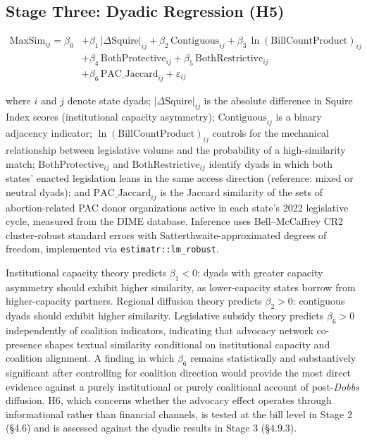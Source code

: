 \subsection{Stage Three: Dyadic Regression (H5)}
\label{sec:stage3}


\begin{equation}
\begin{aligned}
\text{MaxSim}_{ij} = \beta_0 &+ \beta_1\,|\Delta\text{Squire}|_{ij} + \beta_2\,\text{Contiguous}_{ij} + \beta_3\,\ln(\text{BillCountProduct})_{ij} \\
&+ \beta_4\,\text{BothProtective}_{ij} + \beta_5\,\text{BothRestrictive}_{ij} \\
&+ \beta_6\,\text{PAC\_Jaccard}_{ij} + \varepsilon_{ij}
\end{aligned}
\end{equation}

where $i$ and $j$ denote state dyads; $|\Delta\text{Squire}|_{ij}$ is the absolute difference in Squire Index scores (institutional capacity asymmetry); $\text{Contiguous}_{ij}$ is a binary adjacency indicator; $\ln(\text{BillCountProduct})_{ij}$ controls for the mechanical relationship between legislative volume and the probability of a high-similarity match; $\text{BothProtective}_{ij}$ and $\text{BothRestrictive}_{ij}$ identify dyads in which both states' enacted legislation leans in the same access direction (reference: mixed or neutral dyads); and $\text{PAC\_Jaccard}_{ij}$ is the Jaccard similarity of the sets of abortion-related PAC donor organizations active in each state's 2022 legislative cycle, measured from the DIME database. Inference uses Bell--McCaffrey CR2 cluster-robust standard errors with Satterthwaite-approximated degrees of freedom, implemented via \texttt{estimatr::lm\_robust}.

Institutional capacity theory \parencite{squireMeasuringStateLegislative2007,jansaCopyPasteLawmaking2019} predicts $\beta_1 < 0$: dyads with greater capacity asymmetry should exhibit higher similarity, as lower-capacity states borrow from higher-capacity partners. Regional diffusion theory \parencite{walkerDiffusionInnovationsAmerican1969} predicts $\beta_2 > 0$: contiguous dyads should exhibit higher similarity. Legislative subsidy theory \parencite{hallLobbyingLegislativeSubsidy2006a,hertel-fernandezStateCapture2019} predicts $\beta_6 > 0$ independently of coalition indicators, indicating that advocacy network co-presence shapes textual similarity conditional on institutional capacity and coalition alignment. A finding in which $\beta_6$ remains statistically and substantively significant after controlling for coalition direction would provide the most direct evidence against a purely institutional or purely coalitional account of post-\textit{Dobbs} diffusion. H6, which concerns whether the advocacy effect operates through informational rather than financial channels, is tested at the bill level in Stage 2 (§4.6) and is assessed against the dyadic results in Stage 3 (§4.9.3).

